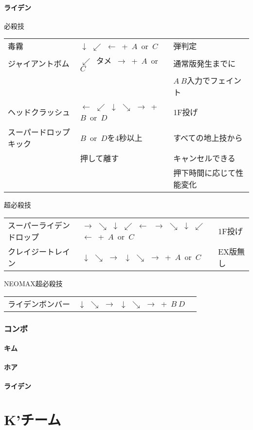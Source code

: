 \documentclass[a4j,11pt]{jarticle}
\def\hien{$\swarrow$\ タメ\ $\rightarrow$}
\def\hado{$\downarrow$ $\searrow$ $\rightarrow$}%
\def\tatsu{$\downarrow$ $\swarrow$ $\leftarrow$}%
\def\yoga{$\leftarrow$ $\swarrow$ $\downarrow$ $\searrow$ $\rightarrow$}%
\def\gyakuyoga{$\rightarrow$ $\searrow$ $\downarrow$ $\swarrow$ $\leftarrow$}%
\begin{document}
\subsection{ライデン}
\begin{itembox}[l]{必殺技}
\begin{tabular}{lll}
毒霧&\tatsu\ +\ $A$\ or\ $C$&弾判定\\%
ジャイアントボム&\hien\ +\ $A$\ or\ $C$&通常版発生までに\\
&&$A\ B$入力でフェイント\\%
ヘッドクラッシュ&\yoga\ +\ $B$\ or\ $D$&1F投げ\\%
スーパードロップキック&$B$\ or\ $D$を4秒以上&すべての地上技から\\%
&押して離す&キャンセルできる\\
&&押下時間に応じて性能変化
\end{tabular}
\end{itembox}
\begin{itembox}[l]{超必殺技}
\begin{tabular}{lll}
スーパーライデンドロップ&\gyakuyoga\ \gyakuyoga\ +\ $A$\ or\ $C$&1F投げ\\%
クレイジートレイン&\hado\ \hado\ +\ $A$\ or\ $C$&EX版無し%
\end{tabular}
\end{itembox}
\begin{itembox}[l]{NEOMAX超必殺技}
\begin{tabular}{lll}
ライデンボンバー&\hado\ \hado\ +\ $B\ D$&%
\end{tabular}
\end{itembox}
\newpage
\section{コンボ}
\subsection{キム}
\subsection{ホア}
\subsection{ライデン}
\newpage
\part{K'チーム}%
\end{document}
